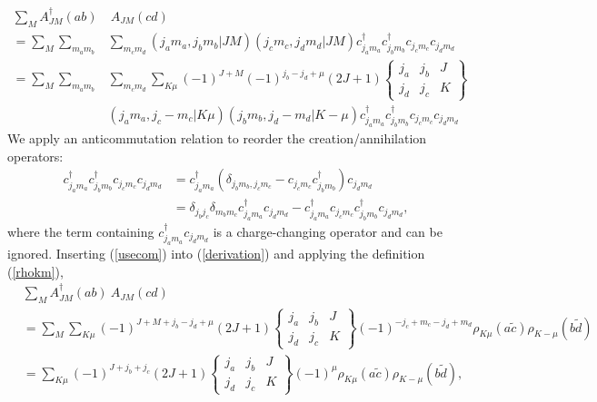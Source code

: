 \begin{equation}\begin{split}\label{derivation}
   \sum_M  A^\dagger_{JM}(ab)&\ A_{JM}(cd) \\
           =\sum_{M}\sum_{m_am_b}&\sum_{m_cm_d} (j_am_a,j_bm_b|JM)(j_cm_c,j_dm_d|JM)
                c^\dagger_{j_am_a}c^\dagger_{j_bm_b}c_{j_cm_c}c_{j_dm_d} \\
           =\sum_{M}\sum_{m_am_b}&\sum_{m_cm_d}\sum_{K\mu}(-1)^{J+M}(-1)^{j_b-j_d+\mu}(2J+1)
                \begin{Bmatrix} j_a & j_b & J \\ j_d & j_c & K \end{Bmatrix} \\ 
          & (j_a m_a, j_c-m_c | K\mu )(j_b m_b, j_d -m_d | K-\mu )
                c^\dagger_{j_am_a}c^\dagger_{j_bm_b}c_{j_cm_c}c_{j_dm_d}
\end{split}\end{equation}
We apply an anticommutation relation to reorder the creation/annihilation operators:
\begin{equation}\begin{split}\label{usecom}
     c^\dagger_{j_am_a}c^\dagger_{j_bm_b}c_{j_cm_c}c_{j_dm_d} &= 
        c^\dagger_{j_am_a}(\delta_{j_bm_b,j_cm_c}-c_{j_cm_c}c^\dagger_{j_bm_b})c_{j_dm_d} \\
        &=\delta_{j_bj_c}\delta_{m_bm_c}c^\dagger_{j_am_a}c_{j_dm_d} 
        - c^\dagger_{j_am_a}c_{j_cm_c}c^\dagger_{j_bm_b}c_{j_dm_d},
\end{split}\end{equation}
where the term containing $c^\dagger_{j_am_a}c_{j_dm_d}$ is a charge-changing 
operator and can be ignored. Inserting (\ref{usecom}) into (\ref{derivation})
and applying the definition (\ref{rhokm}), 
\begin{equation}\begin{split}
    &\sum_M A^\dagger_{JM}(ab)\ A_{JM}(cd) \\
    &=\sum_M\sum_{K\mu}(-1)^{J+M+j_b-j_d+\mu}(2J+1)
        \begin{Bmatrix} j_a & j_b & J \\ j_d & j_c & K \end{Bmatrix}
    (-1)^{-j_c+m_c-j_d+m_d}\rho_{K\mu}
                (a\tilde{c})\rho_{K-\mu}(b\tilde{d}) \\
          &=\sum_{K\mu}(-1)^{J+j_b+j_c}(2J+1)\begin{Bmatrix} j_a & j_b & J \\ 
                j_d & j_c & K \end{Bmatrix}(-1)^\mu \rho_{K\mu}(a\tilde{c})\rho_{K-\mu}
                (b\tilde{d}),
\end{split}\end{equation}
